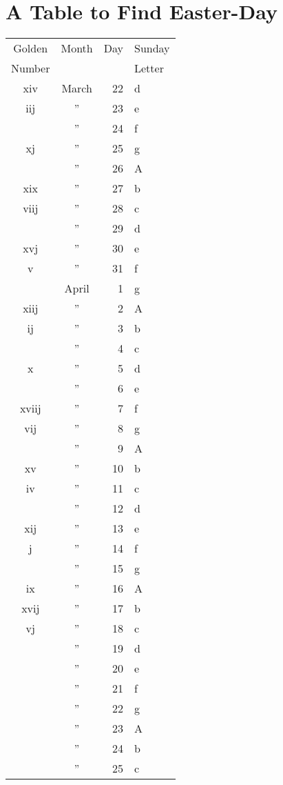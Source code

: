 \section*{A Table to Find Easter-Day}
{\begin{multicols}{2}
{\tiny
\noindent\begin{tabular} { @{}c@{\hspace{.15cm}} c@{\hspace{.2cm}} r@{\hspace{.2cm}} l@{\hspace{.2cm}} }
Golden & Month & Day & Sunday \\
Number &    &   & Letter \\
\hline
xiv & March & 22 & d \\
iij & ” & 23 & e \\
    & ” & 24 & f \\
xj  & ” & 25 & g \\
    & ” & 26 & A \\
xix & ” & 27 & b \\
viij & ” & 28 & c \\
    & ” & 29 & d \\
xvj & ” & 30 & e \\
v   & ” & 31 & f \\
    & April & 1 & g \\
xiij & ” & 2 & A\\
ij & ” & 3 & b\\
  & ” & 4 & c \\
x &	”	&5&	d\\
&”	&6&	e\\
xviij	&”&	7&	f\\
vij	&”&	8&	g\\
&”	&9&	A\\
xv	&”&	10&	b\\
iv	&”&	11&	c\\
&”	&12&	d\\
xij	&”&	13&	e\\
j	&”&	14&	f\\
&”	&15&	g\\
ix	&”&	16&	A\\
xvij	&”&	17&	b\\
vj	&”&	18&	c\\
&”	&19&	d\\
&”	&20&	e\\
&”	&21&	f\\
&”	&22&	g\\
&”	&23&	A\\
&”	&24&	b\\
&”	&25&	c\\


\end{tabular}}
\end{multicols}}
